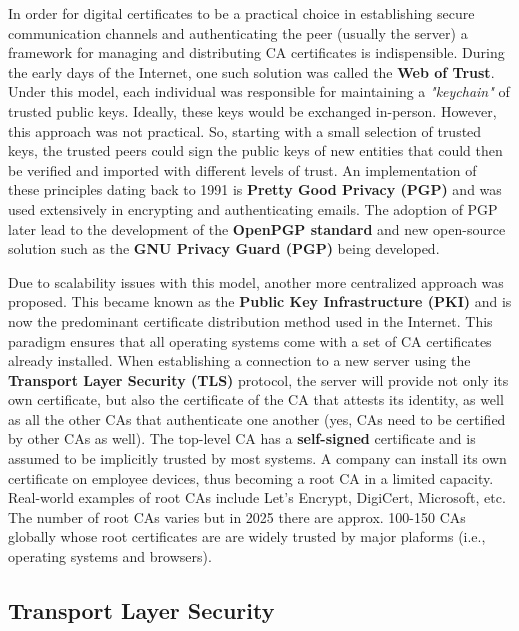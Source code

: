 In order for digital certificates to be a practical choice in establishing
secure communication channels and authenticating the peer (usually the server)
a framework for managing and distributing CA certificates is indispensible.
During the early days of the Internet, one such solution was called the
\textbf{Web of Trust}. Under this model, each individual was responsible for
maintaining a \textit{"keychain"} of trusted public keys. Ideally, these keys
would be exchanged in-person. However, this approach was not practical. So,
starting with a small selection of trusted keys, the trusted peers could sign
the public keys of new entities that could then be verified and imported with
different levels of trust. An implementation of these principles dating back to
1991 is  \textbf{Pretty Good Privacy (PGP)} and was used extensively in
encrypting and authenticating emails. The adoption of PGP later lead to the
development of the \textbf{OpenPGP standard} \cite{callas2007rfc} and new
open-source solution such as the \textbf{GNU Privacy Guard (PGP)} being
developed.

Due to scalability issues with this model, another more centralized approach
was proposed. This became known as the \textbf{Public Key Infrastructure (PKI)}
and is now the predominant certificate distribution method used in the Internet.
This paradigm ensures that all operating systems come with a set of CA
certificates already installed. When establishing a connection to a new server
using the \textbf{Transport Layer Security (TLS)} protocol, the server will
provide not only its own certificate, but also the certificate of the CA that
attests its identity, as well as all the other CAs that authenticate one
another (yes, CAs need to be certified by other CAs as well). The top-level CA
has a \textbf{self-signed} certificate and is assumed to be implicitly trusted
by most systems. A company can install its own certificate on employee devices,
thus becoming a root CA in a limited capacity. Real-world examples of root CAs
include Let's Encrypt, DigiCert, Microsoft, etc. The number of root CAs varies
but in 2025 there are approx. 100-150 CAs globally whose root certificates are
are widely trusted by major plaforms (i.e., operating systems and browsers).


\subsection{Transport Layer Security}


